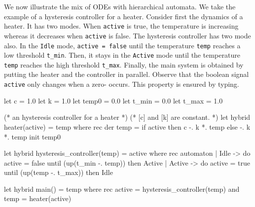 \documentclass[11pt,titlepage,twoside]{report}
\newcommand{\Marc}[1]{{\bf Marc.} {#1} {\bf Fin}}
\begin{document}
We now illustrate the mix of ODEs with hierarchical automata. We take
the example of a hysteresis controller for a heater.  Consider first
the dynamics of a heater. It has two modes. When \texttt{active} is true,
the temperature is increasing whereas it decreases when
\texttt{active} is false. The hysteresis controller has two mode also. In the
\texttt{Idle} mode, \texttt{active = false} until the temperature
\texttt{temp} reaches a low threshold \verb-t_min-. Then, it stays in
the \texttt{Active} mode until the temperature \verb-temp- reaches the
high threshold \verb-t_max-. Finally, the main system is obtained by
putting the heater and the controller in parallel. Observe that the
boolean signal \verb-active- only changes when a zero-
occurs. This property is ensured by typing.
%
%
%
%
%
%
%
\begin{chklisting}
let c = 1.0
let k = 1.0
let temp0 = 0.0
let t_min = 0.0
let t_max = 1.0
\end{chklisting}
\begin{chklisting}[continue]
(* an hysteresis controller for a heater *)
(* [c] and [k] are constant. *)
let hybrid heater(active) = temp where
  rec der temp = if active then c -. k *. temp else -. k *. temp init temp0

let hybrid hysteresis_controller(temp) = active where
  rec automaton
      | Idle -> do active = false until (up(t_min -. temp)) then Active
      | Active -> do active = true until (up(temp -. t_max)) then Idle
 
let hybrid main() = temp where
  rec active = hysteresis_controller(temp)
  and temp = heater(active)
\end{chklisting}
\end{document}
